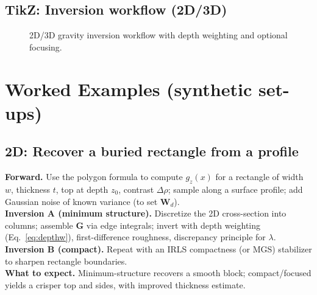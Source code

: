 \documentclass[11pt,a4paper]{article}
\begin{document}
\subsection*{TikZ: Inversion workflow (2D/3D)}
\begin{figure}[h]
\centering
{}
\caption{2D/3D gravity inversion workflow with depth weighting and optional focusing.}
\end{figure}

\section{Worked Examples (synthetic set-ups)}\label{sec:worked}
\subsection{2D: Recover a buried rectangle from a profile}
\textbf{Forward.} Use the polygon formula to compute $g_z(x)$ for a rectangle of width $w$, thickness $t$, top at depth $z_0$, contrast $\Delta\rho$; sample along a surface profile; add Gaussian noise of known variance (to set $\mathbf{W}_d$).\\
\textbf{Inversion A (minimum structure).} Discretize the 2D cross-section into columns; assemble $\mathbf{G}$ via edge integrals; invert with depth weighting (Eq.~\eqref{eq:depthw}), first-difference roughness, discrepancy principle for $\lambda$.\\
\textbf{Inversion B (compact).} Repeat with an IRLS compactness (or MGS) stabilizer to sharpen rectangle boundaries.\\
\textbf{What to expect.} Minimum-structure recovers a smooth block; compact/focused yields a crisper top and sides, with improved thickness estimate.
\end{document}
